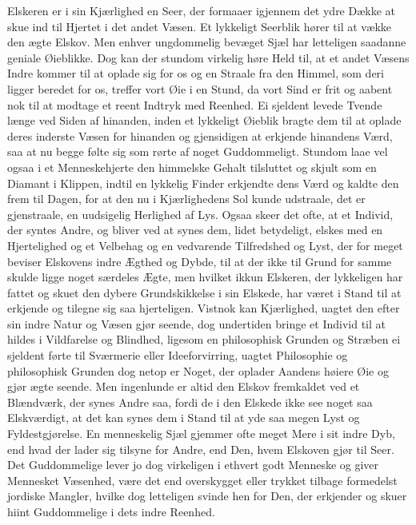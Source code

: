 \documentclass[12pt,a4paper]{book}
\newcommand{\apage}[1]{\marginnote{\footnotesize\textit{[#1]}}}
\begin{document}
Elskeren er i sin Kjærlighed en Seer, der formaaer igjennem det ydre
Dække at skue ind til Hjertet i det andet Væsen. Et lykkeligt Seerblik
hører til at vække den ægte Elskov. Men enhver ungdommelig bevæget Sjæl
har letteligen saadanne geniale Øieblikke. Dog kan der stundom virkelig
høre Held til, at et andet Væsens Indre kommer til at oplade sig for os
og en Straale fra den Himmel, som deri ligger beredet for os, treffer
vort \apage{14} Øie i en Stund, da vort Sind er frit og aabent nok til at modtage
et reent Indtryk med Reenhed. Ei sjeldent levede Tvende længe ved Siden
af hinanden, inden et lykkeligt Øieblik bragte dem til at oplade deres
inderste Væsen for hinanden og gjensidigen at erkjende hinandens Værd,
saa at nu begge følte sig som rørte af noget Guddommeligt. Stundom laae
vel ogsaa i et Menneskehjerte den himmelske Gehalt tilsluttet og skjult
som en Diamant i Klippen, indtil en lykkelig Finder erkjendte dens Værd
og kaldte den frem til Dagen, for at den nu i Kjærlighedens Sol kunde
udstraale, det er gjenstraale, en uudsigelig Herlighed af Lys. Ogsaa
skeer det ofte, at et Individ, der syntes Andre, og bliver ved at synes
dem, lidet betydeligt, elskes med en Hjertelighed og et Velbehag og en
vedvarende Tilfredshed og Lyst, der for meget beviser Elskovens indre
Ægthed og Dybde, til at der ikke til Grund for samme skulde ligge noget
særdeles Ægte, men hvilket ikkun Elskeren, der lykkeligen har fattet og
skuet den dybere Grundskikkelse i sin Elskede, har været i Stand til at
erkjende og tilegne sig saa hjerteligen. Vistnok kan Kjærlighed, uagtet
den efter sin indre Natur og Væsen gjør seende, dog undertiden bringe
et Individ til at hildes i Vildfarelse og Blindhed, ligesom en
philosophisk Grunden og Stræben ei sjeldent førte til Sværmerie eller
Ideeforvirring, uagtet Philosophie og philosophisk Grunden dog netop er
Noget, der oplader Aandens høiere Øie og gjør ægte seende. Men
ingenlunde er altid den Elskov \apage{15} fremkaldet ved et Blændværk, der synes
Andre saa, fordi de i den Elskede ikke see noget saa Elskværdigt, at
det kan synes dem i Stand til at yde saa megen Lyst og Fyldestgjørelse.
En menneskelig Sjæl gjemmer ofte meget Mere i sit indre Dyb, end hvad
der lader sig tilsyne for Andre, end Den, hvem Elskoven gjør til Seer.
Det Guddommelige lever jo dog virkeligen i ethvert godt Menneske og
giver Mennesket Væsenhed, være det end overskygget eller trykket
tilbage formedelst jordiske Mangler, hvilke dog letteligen svinde hen
for Den, der erkjender og skuer hiint Guddommelige i dets indre
Reenhed.
\end{document}
